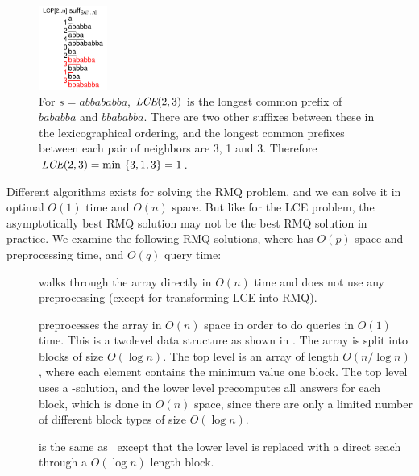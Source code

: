 \documentclass[a4]{article}
\newcommand*{\pref}{\prettyref}
\begin{document}
\begin{figure}[tp]
    \begin{center}
        \includegraphics[width=0.2\textwidth,page=1]{sa+lcp+min.pdf}
    \end{center}
    \caption{\label{fig:sa+lcp+min}For $s=abbababba$, $\textit{LCE}(2,3)$ is the longest common prefix of $bababba$ and $bbababba$. There are two other suffixes between these in the lexicographical ordering, and the longest common prefixes between each pair of neighbors are 3, 1 and 3. Therefore $\textit{LCE}(2,3)= \min ~ \{3, 1, 3\} = 1$.}
\end{figure}

Different algorithms exists for solving the RMQ problem, and we can solve it in optimal $O(1)$ time and $O(n)$ space. But like for the LCE problem, the asymptotically best RMQ solution may not be the best RMQ solution in practice. We examine the following RMQ solutions, where  has $O(p)$ space and preprocessing time, and $O(q)$ query time:
\begin{samepage}
\begin{description}
\item[\RMQn] walks through the array directly in $O(n)$ time and does not use any preprocessing (except for transforming LCE into RMQ).
\item[\RMQq] preprocesses the array in $O(n)$ space in order to do queries in $O(1)$ time. This is a twolevel data structure as shown in \pref{fig:sa+lcp+min-twolevel}. The array is split into blocks of size $O(\log n)$. The top level is an array of length $O(n/\log n)$, where each element contains the minimum value one block. The top level uses a -solution, and the lower level precomputes all answers for each block, which is done in $O(n)$ space, since there are only a limited number of different block types of size $O(\log n)$.
\item[\RMQlog] is the same as \RMQq\ except that the lower level is replaced with a direct seach through a $O(\log n)$ length block.
\end{description}
\end{samepage}
\end{document}
